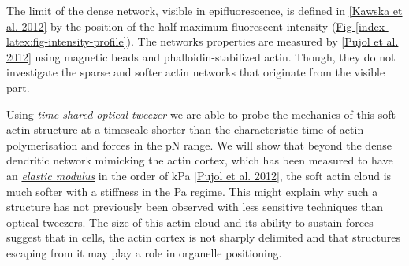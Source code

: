 \documentclass[A4paperpaper,11pt,english]{sphinxmanual}
\begin{document}
The limit of the dense network, visible in epifluorescence, is defined in
{\hyperref[index-latex:kawska2012]{{[}Kawska et al. 2012{]}}} by the position of the half-maximum fluorescent intensity (\hyperref[index-latex:fig-intensity-profile]{Fig  \ref*{index-latex:fig-intensity-profile}}).
The networks properties are measured by {\hyperref[index-latex:pujol2012]{{[}Pujol et al. 2012{]}}} using
magnetic beads and phalloidin-stabilized actin. Though, they do not
investigate the sparse and softer actin networks that originate from the visible
part.

Using {\hyperref[index-latex:time-shared-ot]{\emph{time-shared optical tweezer}}} we are able to probe
the mechanics of this soft actin structure at a timescale shorter than the
characteristic time of actin polymerisation and forces in the pN range. We will show
that beyond the dense dendritic network mimicking the actin cortex, which has
been measured to have an {\hyperref[index-latex:elastic-modulus]{\emph{elastic modulus}}} in the order of
kPa {\hyperref[index-latex:pujol2012]{{[}Pujol et al. 2012{]}}}, the soft actin cloud is much softer with
a stiffness in the Pa regime.  This might explain why such a
structure has not previously been observed with less sensitive techniques than optical
tweezers. The size of this actin cloud and its ability to sustain forces
suggest that in cells, the actin cortex is not sharply delimited and that
structures escaping from it may play a role in organelle positioning.
\end{document}
